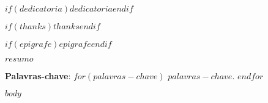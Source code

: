 \documentclass[
	12pt,				%
	openright,			%
	oneside,			%
	a4paper,			%
	brazil				%
	]{abntex2}
\renewcommand{\imprimircapa}{%
  \begin{capa}%
    \center
    \ABNTEXchapterfont\Large \imprimirinstituicao \\
    \vspace*{1cm}
    {\ABNTEXchapterfont\large\imprimirautor}
    \vfill
    \ABNTEXchapterfont\bfseries\LARGE\imprimirtitulo
    \vfill
    \large\imprimirlocal
    \par
    \large\imprimirdata
    \vspace*{1cm}
  \end{capa}
}
\begin{document}
\frenchspacing     %


\imprimircapa

\imprimirfolhaderosto

\begin{dedicatoria}  %
  \vspace*{\fill}
  $if(dedicatoria)$$dedicatoria$$endif$
  \vspace*{\fill}
\end{dedicatoria}


\begin{agradecimentos}
  \bigskip
  $if(thanks)$$thanks$$endif$
\end{agradecimentos}

\begin{epigrafe} %
  \vspace*{\fill}
  \begin{flushright}
    $if(epigrafe)$$epigrafe$$endif$
  \end{flushright}
\end{epigrafe}

\newpage
\setlength{\absparsep}{18pt}   %
\setlength{\abstitleskip}{1cm} %

\begin{resumo}
  \SingleSpacing
  $resumo$

  \textbf{Palavras-chave}:
  $for(palavras-chave)$
  $palavras-chave$.
  $endfor$
\end{resumo}

\tableofcontents*
\cleardoublepage


\textual

$body$


% 

\end{document}
